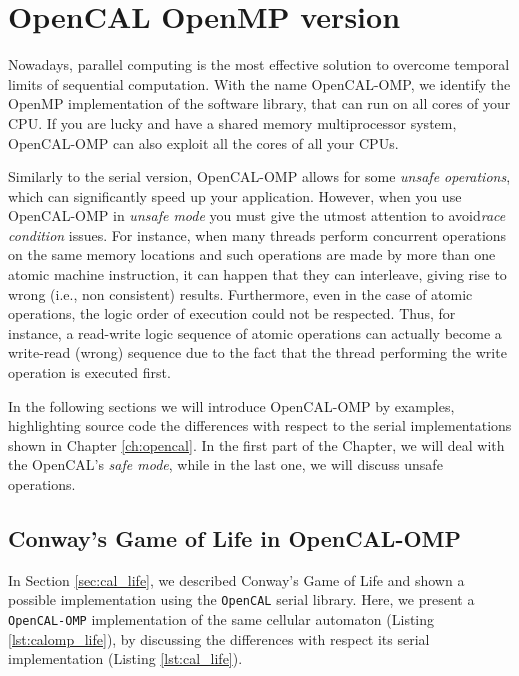 \chapter{OpenCAL OpenMP version}\label{ch:opencal-omp}

Nowadays, parallel computing is the most effective solution to
overcome temporal limits of sequential computation.  With the name
OpenCAL-OMP, we identify the OpenMP implementation of the software
library, that can run on all cores of your CPU. If you are lucky and
have a shared memory multiprocessor system, OpenCAL-OMP can also
exploit all the cores of all your CPUs.

Similarly to the serial version, OpenCAL-OMP allows for some
\emph{unsafe operations}, which can significantly speed up your
application. However, when you use OpenCAL-OMP in \emph{unsafe mode}
you must give the utmost attention to avoid\textsl{race condition}
issues. For instance, when many threads perform concurrent operations
on the same memory locations and such operations are made by more than
one atomic machine instruction, it can happen that they can
interleave, giving rise to wrong (i.e., non consistent)
results. Furthermore, even in the case of atomic operations, the logic
order of execution could not be respected. Thus, for instance, a
read-write logic sequence of atomic operations can actually become a
write-read (wrong) sequence due to the fact that the thread performing
the write operation is executed first.

In the following sections we will introduce OpenCAL-OMP by examples,
highlighting source code the differences with respect to the serial
implementations shown in Chapter \ref{ch:opencal}. In the first part of
the Chapter, we will deal with the OpenCAL's \emph{safe mode}, while in
the last one, we will discuss unsafe operations.

\section{Conway's Game of Life in OpenCAL-OMP}

In Section \ref{sec:cal_life}, we described Conway's Game of Life and
shown a possible implementation using the \verb'OpenCAL' serial
library. Here, we present a \verb'OpenCAL-OMP' implementation of the
same cellular automaton (Listing \ref{lst:calomp_life}), by discussing
the differences with respect its serial implementation (Listing
\ref{lst:cal_life}).



